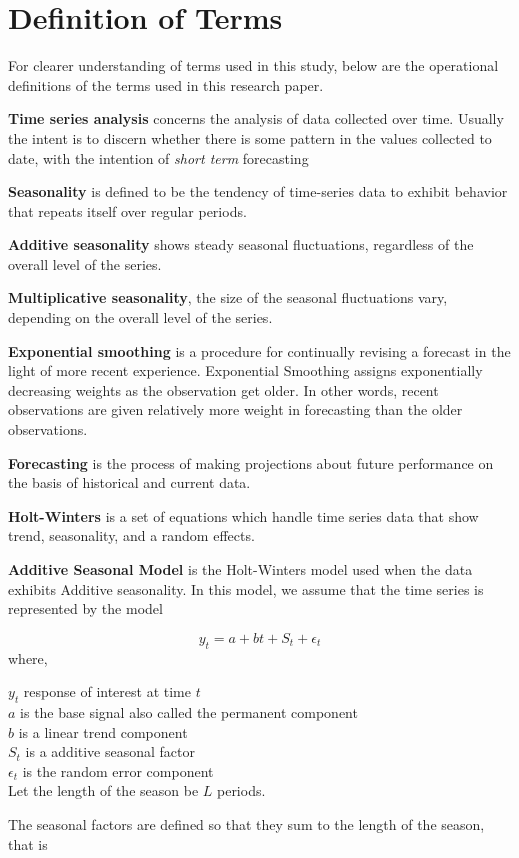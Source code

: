 \section*{Definition of Terms}

For clearer understanding of terms used in this study, below are the operational definitions of the terms used in this research paper.

\textbf{Time series analysis} concerns the analysis of data collected over time. Usually
the intent is to discern whether there is some pattern in the values collected
to date, with the intention of \textit{short term} forecasting

\textbf{Seasonality} is defined to be the tendency
of time-series data to exhibit behavior that repeats itself over regular periods.

\textbf{Additive seasonality} shows steady seasonal fluctuations, regardless of the overall level of the series.

\textbf{Multiplicative seasonality}, the size of the seasonal fluctuations vary,
depending on the overall level of the series.

\textbf{Exponential smoothing} is a procedure for continually revising a forecast in the light of more recent experience. Exponential Smoothing assigns exponentially decreasing weights as the observation get older. In other words, recent observations are given relatively more weight in forecasting than the
older observations.

\textbf{Forecasting} is the process of making projections about future performance on the basis of historical and current data.

\textbf{Holt-Winters} is a set of equations which handle time series data that show trend, seasonality, and a random effects.

\textbf{Additive Seasonal Model} is the Holt-Winters model used when the data exhibits Additive seasonality. In this model, we assume that the time series is represented by the model

\begin{equation}
y_t = a + b t + S_t + \epsilon_t
\end{equation}
where,
\begin{flushleft}
$y_t$ response of interest at time $t$\\
$a$ is the base signal also called the permanent component\\
$b$ is a linear trend component\\
$S_t$ is a additive seasonal factor\\
$\epsilon_t$ is the random error component\\
Let the length of the season be $L$ periods.\\
\end{flushleft}
The seasonal factors are defined so that they sum to the length of the season, that is

